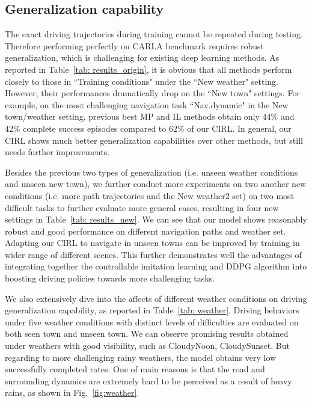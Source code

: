 \documentclass[runningheads]{llncs}
\begin{document}

\subsection{Generalization capability} The exact driving trajectories during training cannot be repeated during testing. Therefore performing perfectly on CARLA benchmark requires robust generalization, which is challenging for existing deep learning methods. As reported in Table~\ref{tab: results_origin}, it is obvious that all methods perform closely to those in ``Training conditions" under the ``New weather" setting. However, their performances dramatically drop on the ``New town" settings. For example, on the most challenging navigation task ``Nav.dynamic" in the New town/weather setting, previous best MP and IL methods obtain only 44\% and 42\% complete success episodes compared to 62\% of our CIRL. In general, our CIRL shows much better generalization capabilities over other methods, but still needs further improvements. 

Besides the previous two types of generalization (i.e. unseen weather conditions and unseen new town), we further conduct more experiments on two another new conditions (i.e. more path trajectories and the New weather2 set) on two most difficult tasks to further evaluate more general cases, resulting in four new settings in Table~\ref{tab: results_new}. We can see that our model shows reasonably robust and good performance on different navigation paths and weather set. Adapting our CIRL to navigate in unseen towns can be improved by training in wider range of different scenes. This further demonstrates well the advantages of integrating together the controllable imitation learning and DDPG algorithm into boosting driving policies towards more challenging tasks.

We also extensively dive into the affects of different weather conditions on driving generalization capability, as reported in Table~\ref{tab: weather}. Driving behaviors under five weather conditions with distinct levels of difficulties are evaluated on both seen town and unseen town. We can observe promising results obtained under weathers with good visibility, such as CloudyNoon, CloudySunset. But regarding to more challenging rainy weathers, the model obtains very low successfully completed rates. One of main reasons is that the road and surrounding dynamics are extremely hard to be perceived as a result of heavy rains, as shown in Fig.~\ref{fig:weather}.
\end{document}
